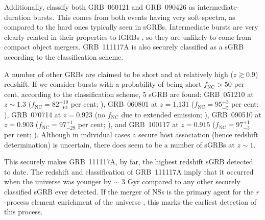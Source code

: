 \documentclass[referee]{aa}
\providecommand{\DIFaddtex}[1]{{\bf #1}} %
\providecommand{\DIFdeltex}[1]{} %
\providecommand{\DIFaddbegin}{} %
\providecommand{\DIFaddend}{} %
\providecommand{\DIFdelbegin}{} %
\providecommand{\DIFdelend}{} %
\providecommand{\DIFadd}[1]{\texorpdfstring{\DIFaddtex{#1}}{#1}} %
\providecommand{\DIFdel}[1]{\texorpdfstring{\DIFdeltex{#1}}{}} %
\newcommand{\DIFscaledelfig}{0.5}
\newlength{\DIFdelgraphicswidth} %
\newlength{\DIFdelgraphicsheight} %
\newcommand{\DIFaddincludegraphics}[2][]{{\color{blue}\fbox{\DIFOincludegraphics[#1]{#2}}}} %
\newcommand{\DIFdelincludegraphics}[2][]{%
\sbox{\DIFdelgraphicsbox}{\DIFOincludegraphics[#1]{#2}}%
\settoboxwidth{\DIFdelgraphicswidth}{\DIFdelgraphicsbox} %
\settoboxtotalheight{\DIFdelgraphicsheight}{\DIFdelgraphicsbox} %
\scalebox{\DIFscaledelfig}{%
\parbox[b]{\DIFdelgraphicswidth}{\usebox{\DIFdelgraphicsbox}\\[-\baselineskip] \rule{\DIFdelgraphicswidth}{0em}}\llap{\resizebox{\DIFdelgraphicswidth}{\DIFdelgraphicsheight}{%
\setlength{\unitlength}{\DIFdelgraphicswidth}%
\begin{picture}(1,1)%
\thicklines\linethickness{2pt} %
{\color[rgb]{1,0,0}\put(0,0){\framebox(1,1){}}}%
{\color[rgb]{1,0,0}\put(0,0){\line( 1,1){1}}}%
{\color[rgb]{1,0,0}\put(0,1){\line(1,-1){1}}}%
\end{picture}%
}\hspace*{3pt}}} %
} %
\DeclareRobustCommand{\DIFaddbegin}{\DIFOaddbegin \let\includegraphics\DIFaddincludegraphics} %
\DeclareRobustCommand{\DIFaddend}{\DIFOaddend \let\includegraphics\DIFOincludegraphics} %
\DeclareRobustCommand{\DIFdelbegin}{\DIFOdelbegin \let\includegraphics\DIFdelincludegraphics} %
\DeclareRobustCommand{\DIFdelend}{\DIFOaddend \let\includegraphics\DIFOincludegraphics} %
\begin{document}
Additionally, \citet{Horvath2010} classify both GRB~060121 and GRB~090426 as
intermediate-duration bursts. This comes from both events having very soft
spectra, as compared to the hard ones typically seen in sGRBs. Intermediate
bursts are very clearly related in their properties to lGRBs
\citep{DeUgartePostigo2011}, so they are unlikely to come from compact object
mergers. GRB~111117A is also securely classified as a sGRB according to the
\citet{Horvath2010} classification scheme.

A number of other GRBs are claimed to be short and at relatively high ($z \gtrsim 0.9$) redshift.
If we consider bursts with a probability of being short $f_{\mathrm{NC}} > 50$ per cent, according to the
\citet{Bromberg2013} classification scheme, 5 sGRB are found:
GRB~051210 at $z \sim 1.3$ ($f_{\mathrm{NC}} = 82_{-61}^{+10}$ per cent;
\citealt{Leibler2010}),
GRB~060801 at $z = 1.131$ ($f_{\mathrm{NC}} = 95_{-5}^{+3}$ per cent;
\citealt{Berger2007}),
GRB~070714 at $z = 0.923$ (no $f_{\mathrm{NC}}$ due to extended emission;
\citealt{Graham2009}),
GRB~090510 at $z = 0.903$ ($f_{\mathrm{NC}} = 97_{-29}^{+1}$ per cent;
\citealt{McBreen2010}), and
GRB~100117 at $z = 0.915$ ($f_{\mathrm{NC}} = 97_{-3}^{+1}$ per cent;
\citealt{Fong2011}). Although in individual cases a secure host association
(hence redshift determination) is uncertain, there does seem to be a number of sGRBs at $z
\sim 1$.

This securely makes GRB~111117A, by far, the highest redshift sGRB detected to
date. The redshift and classification of GRB~111117A imply that it occurred when
the universe was younger by $\sim$ 3 Gyr compared to any other securely
classified sGRB ever detected. If the merger of NSs is the primary agent for the
$r$-process element enrichment of the universe \DIFdelbegin \DIFdel{\citep{Goriely2011, Ji2016,
	Komiya2016}}\DIFdelend \DIFaddbegin \DIFadd{\citep{Goriely2011, Ji2016,
	Komiya2016, Safarzadeh2017}}\DIFaddend , this marks the earliest detection of this process.
\end{document}

